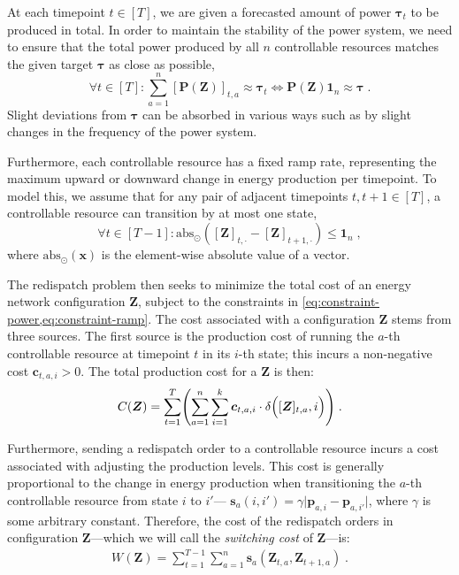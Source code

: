 \documentclass[conference]{IEEEtran}
\newcommand{\bp}{\boldsymbol{p}}
\newcommand{\bP}{\boldsymbol{P}}
\newcommand{\bc}{\boldsymbol{c}}
\newcommand{\bs}{\boldsymbol{s}}
\newcommand{\bZ}{\boldsymbol{Z}}
\newcommand{\btau}{\boldsymbol{\tau}}
\newcommand{\ones}[1]{\boldsymbol{1}_{#1}}
\newcommand{\indices}[1]{[#1]}
\newcommand{\bx}{\boldsymbol{x}}
\newcommand{\g}[1]{#1}
\begin{document}
At each timepoint $t\in\indices{T}$, we are given a forecasted amount of
power $\btau_{t}$ to be produced in total. In order to maintain the
stability of the power system, we need to ensure that the total power
produced by all $n$ controllable resources matches the given target
$\btau$ as close as possible,
\begin{equation}
  \label{eq:constraint-power}
  \forall t \in\indices{T} : 
  \sum_{a=1}^{n}[\g{\bP}(\g{\bZ})]_{t,a}
  \approx \btau_{t}
  \iff
  \g{\bP}(\g{\bZ}) \ones{n}
  \approx \btau\;.
\end{equation}
Slight deviations from $\btau$ can be absorbed in various ways such as
by slight changes in the frequency of the power system.

Furthermore, each controllable resource has a fixed ramp rate,
representing the maximum upward or downward change in energy production
per timepoint. To model this, we assume that for any pair of adjacent
timepoints $t, t+1 \in \indices{T}$, a controllable resource
can transition by at most one state, 
\begin{equation}
  \label{eq:constraint-ramp}
  \forall t \in\indices{T-1} : 
  \text{abs}_{\odot}([\bZ]_{t,\cdot} - [\bZ]_{t+1,\cdot})
  \leq \ones{n}\;,
\end{equation}
where $\text{abs}_{\odot}(\bx)$ is the element-wise absolute value of a
vector.

The redispatch problem then seeks to minimize the total cost of an
energy network configuration $\bZ$, subject to the constraints in
\cref{eq:constraint-power,eq:constraint-ramp}. The cost associated with
a configuration $\bZ$ stems from three sources. The first source is the
production cost of running the $a$-th controllable resource at timepoint
$t$ in its $i$-th state; this incurs a non-negative cost
$\bc_{t,a,i}>0$. The total production cost for a $\bZ$ is then:
\begin{equation}
  \label{eq:cost}
  C(\g{\bZ})=\sum_{t=1}^T\Biggl(
  \sum_{a=1}^n \sum_{i=1}^{k} \g{\bc}_{t,a,i} \cdot
  \delta\Bigl([\bZ]_{t,a},i\Bigr)
  \Biggr)\;.
\end{equation}

Furthermore, sending a redispatch order to a controllable resource
incurs a cost associated with adjusting the production levels. This cost
is generally proportional to the change in energy production when
transitioning the $a$-th controllable resource from state $i$ to $i'$---
$\bs_{a}(i, i') = \gamma \bigl|\g{\bp}_{a,i} - \g{\bp}_{a,i'}\bigr|$,
where $\gamma$ is some arbitrary constant. Therefore, the cost of the
redispatch orders in configuration $\bZ$---which we will call the
\textit{switching cost} of $\bZ$---is:
\begin{gather}
  \label{eq:cost-switching}
  W(\g{\bZ})
  = \sum_{t=1}^{T-1}\sum_{a=1}^{n}
  \bs_{a}(\g{\bZ}_{t,a}, \g{\bZ}_{t+1,a})\;.
\end{gather}
\end{document}
